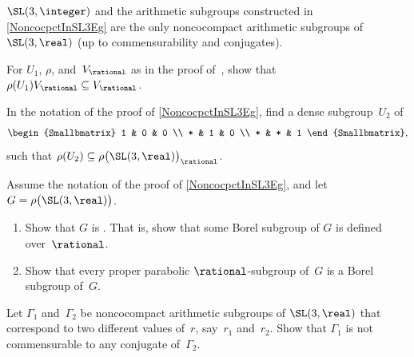 \begin{prop} \label{AllNoncocptSL3RStated}
 $\SL(3,\integer)$ and the arithmetic subgroups constructed in
\cref{NoncocpctInSL3Eg} are the only noncocompact
arithmetic subgroups of\/ $\SL(3,\real)$ \textup(up to
commensurability and conjugates\textup).
 \end{prop}

 

\begin{exercises}

\item \label{NoncocpctInSL3Ex-U1/Q}
 For $U_1$, $\rho$, and~$V_{\rational}$ as in the proof
of~, show that $\rho(U_1)
V_{\rational} \subseteq V_{\rational}$.

\item \label{NoncocpctInSL3Ex-U2}
 In the notation of the proof of
\cref{NoncocpctInSL3Eg}, find a dense subgroup~$U_2$
of 
 $$ \begin{Smallbmatrix}
 1 & 0 & 0 \\
 * & 1 & 0 \\
 * & * & 1 
 \end{Smallbmatrix} ,$$
 such that $\rho(U_2) \subseteq \rho \bigl( \SL(3,\real)
\bigr)_{\rational}$.

\item Assume the notation of the proof of
\cref{NoncocpctInSL3Eg}, and let $G = \rho \bigl(
\SL(3,\real) \bigr)$.
 \begin{enumerate}
 \item Show that $G$ is . That is, show that some Borel subgroup of
$G$ is defined over~$\rational$.
 \item Show that every proper parabolic $\rational$-subgroup
of~$G$ is a Borel subgroup of~$G$.
 \end{enumerate}

\item \label{GammaSL3R(r1<>r2)}
 Let $\Gamma_1$ and~$\Gamma_2$ be noncocompact
arithmetic subgroups of $\SL(3,\real)$ that correspond to two different
values of~$r$, say~$r_1$ and~$r_2$. Show that $\Gamma_1$ is
not commensurable to any conjugate of~$\Gamma_2$.

\end{exercises}










